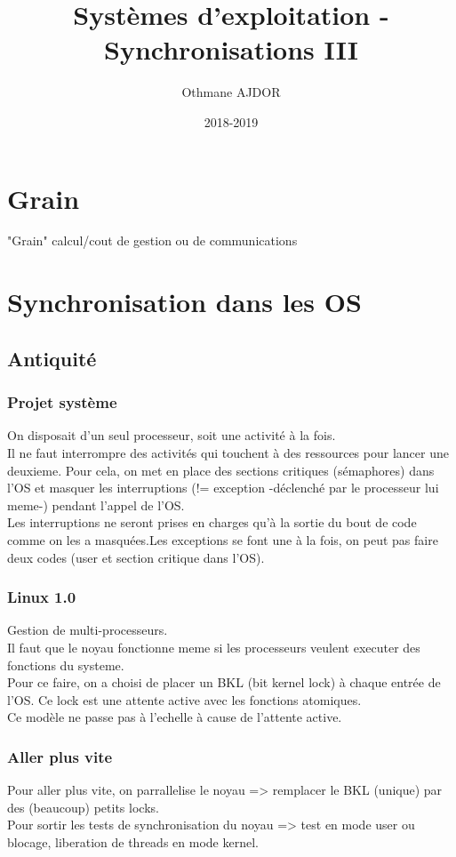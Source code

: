 \documentclass[11pt]{article}
\title{Systèmes d'exploitation - Synchronisations III}
\author{Othmane AJDOR}
\date{2018-2019}
\begin{document}
\maketitle

\pagebreak
\tableofcontents
\pagebreak

\section{Grain}

"Grain" calcul/cout de gestion ou de communications

\section{Synchronisation dans les OS}
\subsection{Antiquité}

\subsubsection{Projet système}
On disposait d'un seul processeur, soit une activité à la fois.\\
Il ne faut interrompre des activités qui touchent à des ressources pour lancer une deuxieme. Pour cela, on met en place des sections critiques (sémaphores) dans l'OS et masquer les interruptions (!= exception -déclenché par le processeur lui meme-) pendant l'appel de l'OS.\\
Les interruptions ne seront prises en charges qu'à la sortie du bout de code comme on les a masquées.Les exceptions se font une à la fois, on peut pas faire deux codes (user et section critique dans l'OS).

\subsubsection{Linux 1.0}
Gestion de multi-processeurs.\\
Il faut que le noyau fonctionne meme si les processeurs veulent executer des fonctions du systeme.\\
Pour ce faire, on a choisi de placer un BKL (bit kernel lock) à chaque entrée de l'OS. Ce lock est une attente active avec les fonctions atomiques.\\
Ce modèle ne passe pas à l'echelle à cause de l'attente active.

\subsubsection{Aller plus vite}
Pour aller plus vite, on parrallelise le noyau => remplacer le BKL (unique) par des (beaucoup) petits locks.\\
Pour sortir les tests de synchronisation du noyau => test en mode user ou blocage, liberation de threads en mode kernel.
\end{document}
